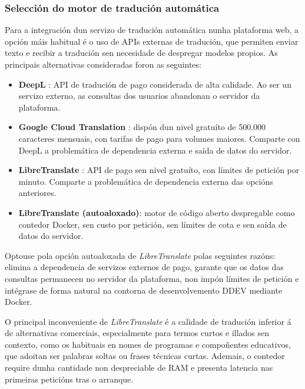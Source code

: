 \documentclass[%
    a4paper,               %
    twoside,               %
    10pt,                  %
]{article}                 %
\begin{document}
\subsubsection{Selección do motor de tradución automática}
\label{anx:libretranslate}

Para a integración dun servizo de tradución automática nunha plataforma web, a opción máis habitual é o uso de APIs externas de tradución, que permiten enviar texto e recibir a tradución sen necesidade de despregar modelos propios. As principais alternativas consideradas foron as seguintes:

\begin{itemize}
    \item \textbf{DeepL} \cite{deepl}: API de tradución de pago considerada de alta calidade. Ao ser un servizo externo, as consultas dos usuarios abandonan o servidor da plataforma.

    \item \textbf{Google Cloud Translation} \cite{google_translate}: dispón dun nivel gratuíto de 500.000 caracteres mensuais, con tarifas de pago para volumes maiores. Comparte con DeepL a problemática de dependencia externa e saída de datos do servidor.

    \item \textbf{LibreTranslate} \cite{libretranslate_portal}: API de pago sen nivel gratuíto, con límites de petición por minuto. Comparte a problemática de dependencia externa das opcións anteriores.

    \item \textbf{LibreTranslate (autoaloxado)}: motor de código aberto despregable como contedor Docker, sen custo por petición, sen límites de cota e sen saída de datos do servidor.
\end{itemize}

Optouse pola opción autoaloxada de \textit{LibreTranslate} polas seguintes razóns: elimina a dependencia de servizos externos de pago, garante que os datos das consultas permanecen no servidor da plataforma, non impón límites de petición e intégrase de forma natural na contorna de desenvolvemento DDEV mediante Docker.

O principal inconveniente de \textit{LibreTranslate} é a calidade de tradución inferior á de alternativas comerciais, especialmente para termos curtos e illados sen contexto, como os habituais en nomes de programas e compoñentes educativos, que adoitan ser palabras soltas ou frases técnicas curtas. Ademais, o contedor require dunha cantidade non despreciable de RAM e presenta latencia nas primeiras peticións tras o arranque.
\end{document}
